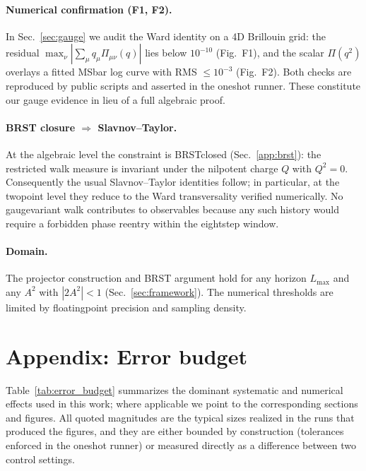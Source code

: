 \documentclass[11pt,a4paper]{article}
\theoremstyle{definition}
\theoremstyle{remark}
\begin{document}
\paragraph{Numerical confirmation (F1, F2).}
In Sec.~\ref{sec:gauge} we audit the Ward identity on a 4D Brillouin grid: the residual $\max_{\nu}|\sum_{\mu}q_{\mu}\Pi_{\mu\nu}(q)|$ lies below $10^{-10}$ (Fig.~F1), and the scalar $\Pi(q^2)$ overlays a fitted MS\-bar log curve with RMS $\le 10^{-3}$ (Fig.~F2). Both checks are reproduced by public scripts and asserted in the one\-shot runner. These constitute our gauge evidence in lieu of a full algebraic proof.

\paragraph{BRST closure $\Rightarrow$ Slavnov--Taylor.}
At the algebraic level the constraint is BRST\-closed (Sec.~\ref{app:brst}): the restricted walk measure is invariant under the nilpotent charge $Q$ with $Q^{2}=0$. Consequently the usual Slavnov--Taylor identities follow; in particular, at the two\-point level they reduce to the Ward transversality verified numerically. No gauge\-variant walk contributes to observables because any such history would require a forbidden phase re\-entry within the eight\-step window.

\paragraph{Domain.}
The projector construction and BRST argument hold for any horizon $L_{\max}$ and any $A^{2}$ with $|2A^{2}|<1$ (Sec.~\ref{sec:framework}). The numerical thresholds are limited by floating\-point precision and sampling density.

\section{Appendix: Error budget}
\label{app:error-budget}

Table~\ref{tab:error_budget} summarizes the dominant systematic and numerical effects used in this work; where applicable we point to the corresponding sections and figures. All quoted magnitudes are the typical sizes realized in the runs that produced the figures, and they are either bounded by construction (tolerances enforced in the one\-shot runner) or measured directly as a difference between two control settings.
\end{document}
